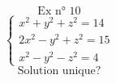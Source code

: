 \documentclass{article}
\begin{document}
\[ \text{Ex n° 10} \]
\[
\begin{cases}
x^2 + y^2 + z^2 = 14 \\
2x^2 - y^2 + z^2 = 15 \\
x^2 - y^2 - z^2 = 4
\end{cases}
\]
\[ \text{Solution unique?} \]
\end{document}
